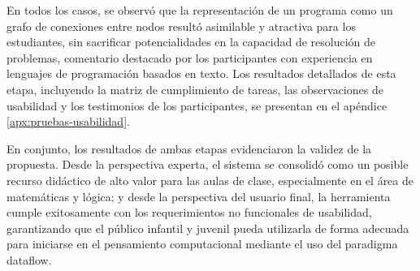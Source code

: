 En todos los casos, se observó que la representación de un programa como un grafo de conexiones entre nodos resultó asimilable y atractiva para los estudiantes, sin sacrificar potencialidades en la capacidad de resolución de problemas, comentario destacado por los participantes con experiencia en lenguajes de programación basados en texto. Los resultados detallados de esta etapa, incluyendo la matriz de cumplimiento de tareas, las observaciones de usabilidad y los testimonios de los participantes, se presentan en el apéndice \ref{apx:pruebas-usabilidad}.


En conjunto, los resultados de ambas etapas evidenciaron la validez de la propuesta. Desde la perspectiva experta, el sistema se consolidó como un posible recurso didáctico de alto valor para las aulas de clase, especialmente en el área de matemáticas y lógica; y desde la perspectiva del usuario final, la herramienta cumple exitosamente con los requerimientos no funcionales de usabilidad, garantizando que el público infantil y juvenil pueda utilizarla de forma adecuada para iniciarse en el pensamiento computacional mediante el uso del paradigma dataflow.